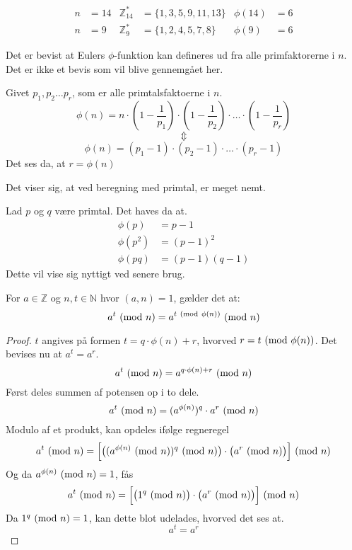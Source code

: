 \begin{eks}
    \mbox{}\vspace*{-1.5em}
    \begin{align*}
        n &= 14 & \mathbb{Z}_{14}^*  &= \{1, 3, 5, 9, 11, 13 \} & \phi(14) &= 6\\
        n &= 9  & \mathbb{Z}_9^*     &= \{1, 2, 4, 5, 7, 8\}    & \phi(9)  &= 6
    \end{align*}
\end{eks}

Det er bevist at Eulers \(\phi\)-funktion kan defineres ud fra alle primfaktorerne i \(n\).
Det er ikke et bevis som vil blive gennemgået her.

\begin{sent}
    Givet \(p_1, p_2 \hdots p_r\), som er alle primtalsfaktoerne i \(n\).
    \[\phi(n) = n \cdot \left(1-\frac{1}{p_1}\right) \cdot \left(1-\frac{1}{p_2}\right) \cdot \hdots \cdot \left(1-\frac{1}{p_r}\right)\]
    \[\Updownarrow\]
    \[\phi(n) = (p_1 - 1) \cdot (p_2 - 1) \cdot \hdots \cdot (p_r - 1)\]
    Det ses da, at \(r = \phi(n)\)
\end{sent}

Det viser sig, at ved beregning med primtal, er meget nemt.

\begin{eks}
    Lad \(p\) og \(q\) være primtal. Det haves da at.\\
    \begin{align}
        \phi(p)   &= p - 1\\
        \phi(p^2) &= (p - 1)^2\\
        \phi(p q) &= (p - 1)(q - 1)
    \end{align}
    Dette vil vise sig nyttigt ved senere brug.
\end{eks}




\vspace{100pt}



\begin{sent}
    For \(a \in \mathbb{Z}\) og \(n, t \in \mathbb{N}\) hvor \((a, n) = 1\), gælder det at:
    \[a^t \ (\mathrm{mod}\ n) = a^{t \ (\mathrm{mod}\ \phi(n))} \ (\mathrm{mod}\ n)\]
\end{sent}


\begin{proof}
    \(t\) angives på formen \(t = q \cdot \phi(n) + r\), hvorved \(r = t \ (\mathrm{mod}\ \phi(n))\).
    Det bevises nu at \(a^t = a^r\).
    \[a^t \ (\mathrm{mod}\ n) = a^{q \cdot \phi(n) + r} \ (\mathrm{mod}\ n)\]
    Først deles summen af potensen op i to dele.
    \[a^t \ (\mathrm{mod}\ n) = (a^{\phi(n)})^q \cdot a^r \ (\mathrm{mod}\ n)\]
    Modulo af et produkt, kan opdeles ifølge regneregel %
    \[a^t \ (\mathrm{mod}\ n) = \Big[ \big( (a^{\phi(n)} \ (\mathrm{mod}\ n))^q \ (\mathrm{mod}\ n) \big) \cdot \big( a^r \ (\mathrm{mod}\ n) \big) \Big] \ (\mathrm{mod}\ n)\] %
    Og da \(a^{\phi(n)} \ (\mathrm{mod}\ n) = 1\), fås
    \[a^t \ (\mathrm{mod}\ n) = \Big[ \big( 1^q \ (\mathrm{mod}\ n) \big) \cdot \big( a^r \ (\mathrm{mod}\ n) \big) \Big] \ (\mathrm{mod}\ n)\]
    Da \(1^q \ (\mathrm{mod}\ n) = 1\), kan dette blot udelades, hvorved det ses at.
    \[a^t = a^r\]
\end{proof}
